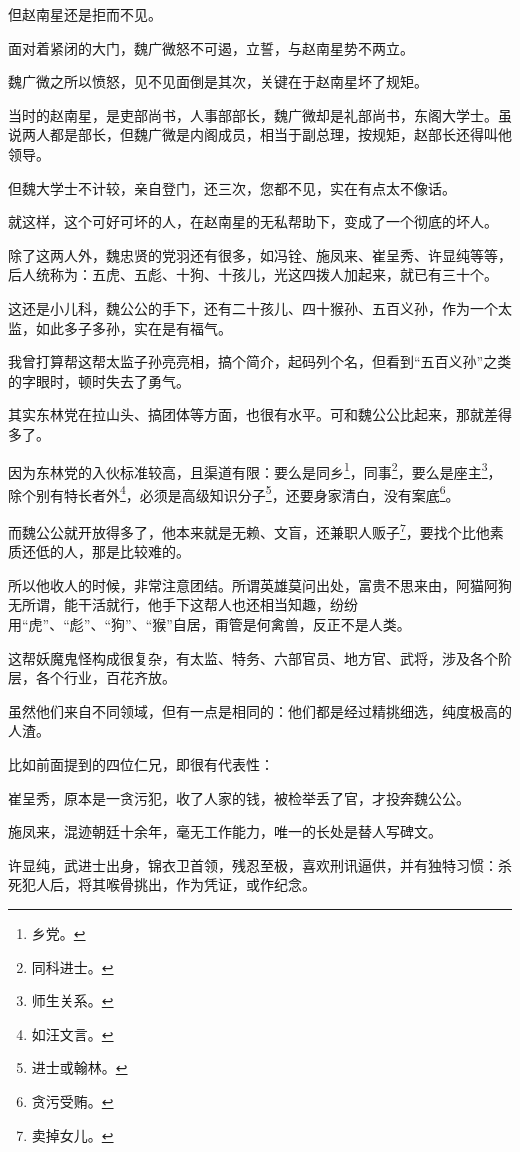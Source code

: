 \begin{multicols}{\theparacolNo}
但赵南星还是拒而不见。

面对着紧闭的大门，魏广微怒不可遏，立誓，与赵南星势不两立。

魏广微之所以愤怒，见不见面倒是其次，关键在于赵南星坏了规矩。

当时的赵南星，是吏部尚书，人事部部长，魏广微却是礼部尚书，东阁大学士。虽说两人都是部长，但魏广微是内阁成员，相当于副总理，按规矩，赵部长还得叫他领导。

但魏大学士不计较，亲自登门，还三次，您都不见，实在有点太不像话。

就这样，这个可好可坏的人，在赵南星的无私帮助下，变成了一个彻底的坏人。

除了这两人外，魏忠贤的党羽还有很多，如冯铨、施凤来、崔呈秀、许显纯等等，后人统称为：五虎、五彪、十狗、十孩儿，光这四拨人加起来，就已有三十个。

这还是小儿科，魏公公的手下，还有二十孩儿、四十猴孙、五百义孙，作为一个太监，如此多子多孙，实在是有福气。

我曾打算帮这帮太监子孙亮亮相，搞个简介，起码列个名，但看到“五百义孙”之类的字眼时，顿时失去了勇气。

其实东林党在拉山头、搞团体等方面，也很有水平。可和魏公公比起来，那就差得多了。

因为东林党的入伙标准较高，且渠道有限：要么是同乡\footnote{乡党。}，同事\footnote{同科进士。}，要么是座主\footnote{师生关系。}，除个别有特长者外\footnote{如汪文言。}，必须是高级知识分子\footnote{进士或翰林。}，还要身家清白，没有案底\footnote{贪污受贿。}。

而魏公公就开放得多了，他本来就是无赖、文盲，还兼职人贩子\footnote{卖掉女儿。}，要找个比他素质还低的人，那是比较难的。

所以他收人的时候，非常注意团结。所谓英雄莫问出处，富贵不思来由，阿猫阿狗无所谓，能干活就行，他手下这帮人也还相当知趣，纷纷用“虎”、“彪”、“狗”、“猴”自居，甭管是何禽兽，反正不是人类。

这帮妖魔鬼怪构成很复杂，有太监、特务、六部官员、地方官、武将，涉及各个阶层，各个行业，百花齐放。

虽然他们来自不同领域，但有一点是相同的：他们都是经过精挑细选，纯度极高的人渣。

比如前面提到的四位仁兄，即很有代表性：

崔呈秀，原本是一贪污犯，收了人家的钱，被检举丢了官，才投奔魏公公。

施凤来，混迹朝廷十余年，毫无工作能力，唯一的长处是替人写碑文。

许显纯，武进士出身，锦衣卫首领，残忍至极，喜欢刑讯逼供，并有独特习惯：杀死犯人后，将其喉骨挑出，作为凭证，或作纪念。


\end{multicols}

